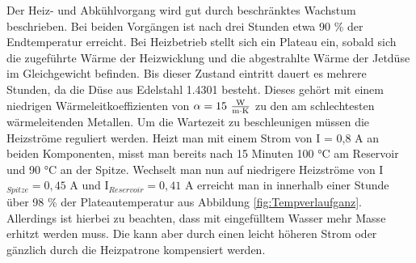 Der Heiz- und Abkühlvorgang wird gut durch beschränktes Wachstum beschrieben. Bei beiden Vorgängen ist nach drei Stunden etwa 90 \% der Endtemperatur erreicht. Bei Heizbetrieb stellt sich ein Plateau ein, sobald sich die zugeführte Wärme der Heizwicklung und die abgestrahlte Wärme der Jetdüse im Gleichgewicht befinden. Bis dieser Zustand eintritt dauert es mehrere Stunden, da die Düse aus Edelstahl 1.4301 besteht. Dieses gehört mit einem niedrigen Wärmeleitkoeffizienten von $\alpha = 15\ \frac{\textmd{W}}{\textmd{m}\cdot \textmd{K}}$ zu den am schlechtesten wärmeleitenden Metallen. Um die Wartezeit zu beschleunigen müssen die Heizströme reguliert werden. Heizt man mit einem Strom von I = 0,8 A an beiden Komponenten, misst man bereits nach 15 Minuten 100 °C am Reservoir und 90 °C an der Spitze. Wechselt man nun auf niedrigere Heizströme von I$_{Spitze} = 0,45$ A und I$_{Reservoir} = 0,41$ A erreicht man in innerhalb einer Stunde über 98 \% der Plateautemperatur aus Abbildung \ref{fig:Tempverlaufganz}. Allerdings ist hierbei zu beachten, dass mit eingefülltem Wasser mehr Masse erhitzt werden muss. Die kann aber durch einen leicht höheren Strom oder gänzlich durch die Heizpatrone kompensiert werden.
